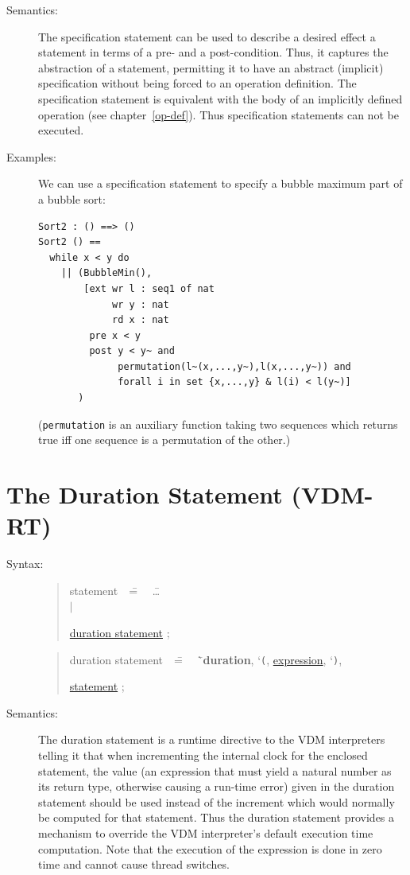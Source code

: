 \documentclass{overturerepchap}
\newcommand{\Lit}[1]{`{\tt #1}\Quote}
\newcommand{\Rule}[2]{
  \begin{quote}\begin{tabbing}
    #1\index{#1}\ \ \= = \ \ \= #2  ; %

  \end{tabbing}\end{quote}
  }
\newcommand{\Ruleref}[1]{
  \hyperlink{rule:#1}{#1}}
\newcommand{\dsep}{\\ \> $|$ \>}
\newcommand{\Lop}[1]{`{\bf\ttfamily #1}\Quote}
\begin{document}
{\begin{description}
\item[Semantics:]

The specification statement can be used to describe a desired effect a
statement in terms of a pre- and a post-condition. Thus, it captures
the abstraction of a statement, permitting it to have an abstract
(implicit) specification without being forced to an operation
definition. The specification statement is equivalent with the body of
an implicitly defined operation (see chapter~\ref{op-def}). Thus
specification statements can not be executed.

\item[Examples:] We can use a specification statement to specify a
  bubble maximum part of a bubble sort:
\begin{lstlisting}
Sort2 : () ==> ()
Sort2 () ==
  while x < y do
    || (BubbleMin(),
        [ext wr l : seq1 of nat
             wr y : nat
             rd x : nat
         pre x < y
         post y < y~ and
              permutation(l~(x,...,y~),l(x,...,y~)) and
              forall i in set {x,...,y} & l(i) < l(y~)]
       )
\end{lstlisting}
  (\texttt{permutation} is an auxiliary function taking two sequences
  which returns true iff one sequence is a permutation of the other.)


\end{description}

\section{The Duration Statement (VDM-RT)}
\begin{description}
\item[Syntax:]
  \Rule{statement}{
    \ldots \dsep
    \Ruleref{duration statement}
  }
  \Rule{duration statement}{
    \Lop{duration}, \Lit{(}, \Ruleref{expression}, \Lit{)},
    \Ruleref{statement}
  }

\item[Semantics:]
The duration statement is a runtime directive to the VDM
interpreters telling it that when incrementing the internal clock for the
enclosed statement, the value (an expression that must yield a natural number as its return type, otherwise causing a run-time error)
given in the duration statement should
be used instead of the increment which would normally be computed for that
statement. Thus the duration statement provides a mechanism to
override the VDM interpreter's default execution time computation. Note that the execution
of the expression is done in zero time and cannot cause thread switches.



\end{description}}
\end{document}
